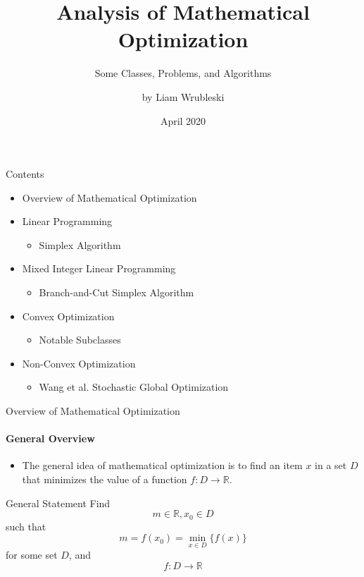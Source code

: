 \documentclass{beamer}
\title{Analysis of Mathematical Optimization}
\subtitle{Some Classes, Problems, and Algorithms}
\author{by Liam Wrubleski}
\date{April 2020}
\begin{document}
	\maketitle
	\begin{frame}{Contents}
		\begin{itemize}
			\item Overview of Mathematical Optimization
			\item Linear Programming
			\begin{itemize}
				\item Simplex Algorithm
			\end{itemize}
			\item Mixed Integer Linear Programming
			\begin{itemize}
				\item Branch-and-Cut Simplex Algorithm
			\end{itemize}
			\item Convex Optimization
			\begin{itemize}
				\item Notable Subclasses
			\end{itemize}
			\item Non-Convex Optimization
			\begin{itemize}
				\item Wang et al. Stochastic Global Optimization
			\end{itemize}
		\end{itemize}
	\end{frame}
	
	\begin{frame}{Overview of Mathematical Optimization}
		\framesubtitle{General Overview}
		\begin{itemize}
			\item The general idea of mathematical optimization is to find an item $x$ in a set $D$ that minimizes the value of a function $f:D\to\mathbb{R}$.
		\end{itemize}
		\begin{block}{General Statement}
			Find \[m\in\mathbb{R}, x_0\in D\]
			such that\[m = f(x_0) = \min_{x\in D} \{f(x)\}\]
			for some set $D$, and \[f:D\to\mathbb{R}\]
		\end{block}
	\end{frame}
\end{document}
